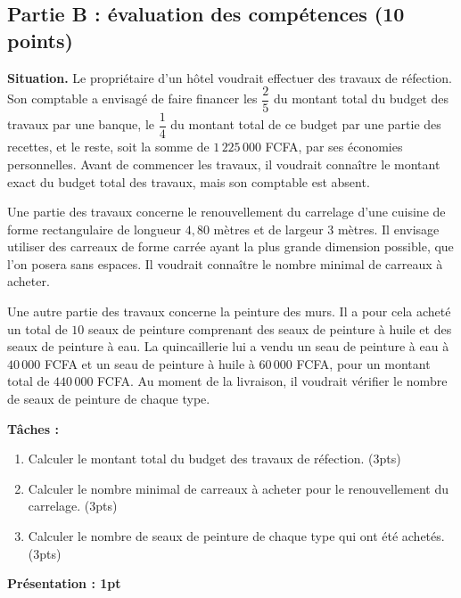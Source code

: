 \subsection*{Partie B : évaluation des compétences (10 points)}

\textbf{Situation.} Le propriétaire d'un hôtel voudrait effectuer des travaux de
réfection. Son comptable a envisagé de faire financer les $\dfrac25$ du montant total du
budget des travaux par une banque, le $\dfrac14$ du montant total de ce budget par une
partie des recettes, et le reste, soit la somme de $1\,225\,000$ FCFA, par ses économies
personnelles. Avant de commencer les travaux, il voudrait connaître le montant exact du
budget total des travaux, mais son comptable est absent.

Une partie des travaux concerne le renouvellement du carrelage d'une cuisine de forme
rectangulaire de longueur $4{,}80$ mètres et de largeur $3$ mètres. Il envisage utiliser des
carreaux de forme carrée ayant la plus grande dimension possible, que l'on posera sans
espaces. Il voudrait connaître le nombre minimal de carreaux à acheter.

Une autre partie des travaux concerne la peinture des murs. Il a pour cela acheté un total
de $10$ seaux de peinture comprenant des seaux de peinture à huile et des seaux de peinture
à eau. La quincaillerie lui a vendu un seau de peinture à eau à $40\,000$ FCFA et un seau de
peinture à huile à $60\,000$ FCFA, pour un montant total de $440\,000$ FCFA. Au moment de la
livraison, il voudrait vérifier le nombre de seaux de peinture de chaque type.

\textbf{Tâches :}
\begin{enumerate}[label=\arabic*)]
\item Calculer le montant total du budget des travaux de réfection. \hfill (3pts)
\item Calculer le nombre minimal de carreaux à acheter pour le renouvellement du carrelage.
\hfill (3pts)
\item Calculer le nombre de seaux de peinture de chaque type qui ont été achetés. \hfill
(3pts)
\end{enumerate}
\noindent\hfill\textbf{Présentation : 1pt}

